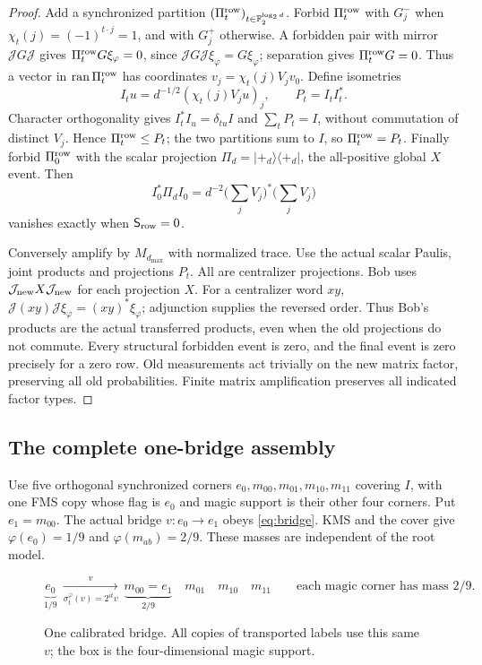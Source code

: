 \begin{proof}
Add a synchronized partition $(\Pi_t^{\rm row})_{t\in\mathbb F_2^{\log_2d}}$.
Forbid $\Pi_t^{\rm row}$ with $G_j^-$ when
$\chi_t(j)=(-1)^{t\cdot j}=1$, and with $G_j^+$ otherwise.
A forbidden pair with mirror $\mathcal JG\mathcal J$ gives
$\Pi_t^{\rm row}G\xi_\varphi=0$, since $\mathcal JG\mathcal J\xi_\varphi=G\xi_\varphi$;
separation gives $\Pi_t^{\rm row}G=0$. Thus a vector in $\operatorname{ran} \Pi_t^{\rm row}$ has
coordinates $v_j=\chi_t(j)V_jv_0$.
Define isometries
\[
 I_tu=d^{-1/2}(\chi_t(j)V_ju)_j,\qquad P_t=I_tI_t^*.
\]
Character orthogonality gives $I_t^*I_u=\delta_{tu}I$ and
$\sum_tP_t=I$, without commutation of distinct $V_j$.
Hence $\Pi_t^{\rm row}\leq P_t$; the two partitions sum to $I$, so $\Pi_t^{\rm row}=P_t$.
Finally forbid $\Pi_0^{\rm row}$ with the scalar projection
$\Pi_d=|+_d\rangle\langle+_d|$, the all-positive global $X$ event.
Then
\[
 I_0^*\Pi_dI_0=d^{-2}\Big(\sum_jV_j\Big)^*
                         \Big(\sum_jV_j\Big)
\]
vanishes exactly when $\mathsf S_{\rm row}=0$.

Conversely amplify by $M_{d_{\max}}$ with normalized trace.
Use the actual scalar Paulis, joint products and projections $P_t$.
All are centralizer projections. Bob uses $\mathcal J_{\rm new}X\mathcal J_{\rm new}$
for each projection $X$. For a centralizer word $xy$,
$\mathcal J(xy)\mathcal J\xi_\varphi=(xy)^*\xi_\varphi$; adjunction supplies the
reversed order. Thus Bob's products are the actual transferred
products, even when the old projections do not commute.
Every structural forbidden event is zero, and the final event is
zero precisely for a zero row. Old measurements act trivially on
the new matrix factor, preserving all old probabilities.
Finite matrix amplification preserves all indicated factor types.
\end{proof}

\subsection{The complete one-bridge assembly}
Use five orthogonal synchronized corners
$e_0,m_{00},m_{01},m_{10},m_{11}$ covering $I$, with one FMS copy
whose flag is $e_0$ and magic support is their other four corners.
Put $e_1=m_{00}$. The actual bridge $v:e_0\to e_1$ obeys
\eqref{eq:bridge}. KMS and the cover give $\varphi(e_0)=1/9$ and
$\varphi(m_{ab})=2/9$. These masses are independent of the root model.

\begin{figure}[ht]
\centering
\[
 \underbrace{e_0}_{1/9}
 \ \xrightarrow[\sigma_t^\varphi(v)=2^{it}v]{v}\
 \boxed{\underbrace{m_{00}=e_1}_{2/9}\quad
 m_{01}\quad m_{10}\quad m_{11}}
 \qquad\text{each magic corner has mass }2/9.
\]
\caption{One calibrated bridge. All copies of transported labels use
this same $v$; the box is the four-dimensional magic support.}
\end{figure}

